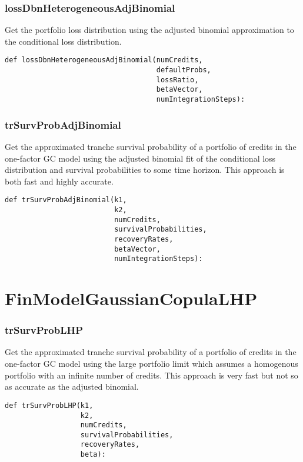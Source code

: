 \documentclass[twoside,11pt]{book}
\begin{document}
\subsubsection*{{\bf lossDbnHeterogeneousAdjBinomial}}
Get the portfolio loss distribution using the adjusted binomial approximation to the conditional loss distribution.  

\begin{lstlisting}
def lossDbnHeterogeneousAdjBinomial(numCredits,
                                    defaultProbs,
                                    lossRatio,
                                    betaVector,
                                    numIntegrationSteps):
\end{lstlisting}

\subsubsection*{{\bf trSurvProbAdjBinomial}}
Get the approximated tranche survival probability of a portfolio of credits in the one-factor GC model using the adjusted binomial fit of the conditional loss distribution and survival probabilities to some time horizon. This approach is both fast and highly accurate.  

\begin{lstlisting}
def trSurvProbAdjBinomial(k1,
                          k2,
                          numCredits,
                          survivalProbabilities,
                          recoveryRates,
                          betaVector,
                          numIntegrationSteps):
\end{lstlisting}

\newpage
\section{FinModelGaussianCopulaLHP}

\subsubsection*{{\bf trSurvProbLHP}}
Get the approximated tranche survival probability of a portfolio of credits in the one-factor GC model using the large portfolio limit which assumes a homogenous portfolio with an infinite number of credits. This approach is very fast but not so as accurate as the adjusted binomial.  

\begin{lstlisting}
def trSurvProbLHP(k1,
                  k2,
                  numCredits,
                  survivalProbabilities,
                  recoveryRates,
                  beta):
\end{lstlisting}
\end{document}
